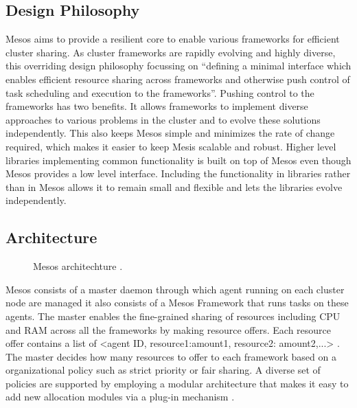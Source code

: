 \documentclass[9pt,twocolumn,twoside]{../../styles/osajnl}
\begin{document}
\subsection{Design Philosophy}
Mesos aims to provide a resilient core to enable various frameworks
for efficient cluster sharing. As cluster frameworks are rapidly
evolving and highly diverse, this overriding design philosophy
focussing on ``defining a minimal interface which enables efficient
resource sharing across frameworks and otherwise push control of task
scheduling and execution to the frameworks''. Pushing control to the
frameworks has two benefits. It allows frameworks to implement diverse
approaches to various problems in the cluster and to evolve these
solutions independently. This also keeps Mesos simple and minimizes
the rate of change required, which makes it easier to keep Mesis
scalable and robust. Higher level libraries implementing common
functionality is built on top of Mesos even though Mesos provides a
low level interface. Including the functionality in libraries rather
than in Mesos allows it to remain small and flexible and lets the
libraries evolve independently.

\subsection{Architecture}

\begin{figure}[htbp]
\centering
{}
\caption{Mesos architechture \cite{www-mesos-arch}.}
\label{fig:false-color}
\end{figure}

Mesos consists of a master daemon through which agent running on each
cluster node are managed it also consists of a Mesos Framework that
runs tasks on these agents.  The master enables the fine-grained
sharing of resources including CPU and RAM across all the frameworks
by making resource offers. Each resource offer contains a list of
<agent ID, resource1:amount1, resource2: amount2,...>
\cite{www-mesos-arch}. The master decides how many resources to offer
to each framework based on a organizational policy such as strict
priority or fair sharing. A diverse set of policies are supported by
employing a modular architecture that makes it easy to add new
allocation modules via a plug-in mechanism \cite{www-mesos}.
\end{document}

